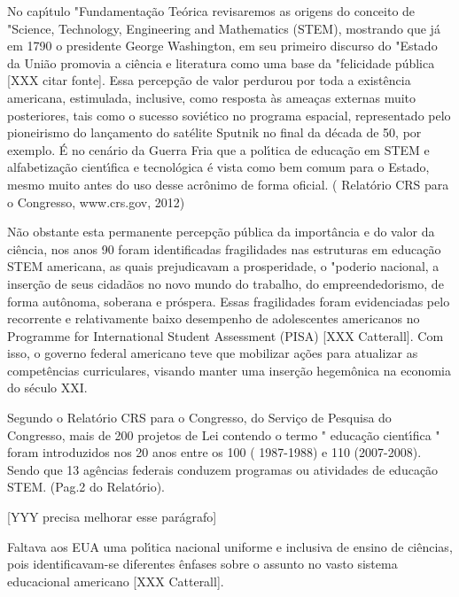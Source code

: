 \documentclass[
12pt,		%
openright,	%
twoside,  %
a4paper,			%
chapter=TITLE,		%
english,			%
french,				%
spanish,			%
brazil				%
]{USPSC-classe/USPSC}
\begin{document}
No cap\'{\i}tulo "Fundamenta\c{c}\~ao Te\'orica revisaremos as origens do conceito de "Science, Technology, Engineering and Mathematics (STEM), mostrando que j\'a em 1790 o  presidente George Washington, em seu primeiro discurso do "Estado da Uni\~ao promovia a ci\^encia e literatura como uma base da "felicidade p\'ublica [XXX citar fonte]. Essa percep\c{c}\~ao de valor perdurou por toda a exist\^encia americana, estimulada, inclusive, como resposta \`as amea\c{c}as externas muito posteriores, tais como o sucesso sovi\'etico no programa espacial, representado pelo pioneirismo do lan\c{c}amento do sat\'elite Sputnik no final da d\'ecada de 50, por exemplo. \'E no cen\'ario da Guerra Fria que a pol\'{\i}tica de educa\c{c}\~ao em STEM e alfabetiza\c{c}\~ao  cient\'{\i}fica e tecnol\'ogica  \'e vista como bem comum para o Estado, mesmo muito antes do uso desse acr\^onimo de forma oficial. ( Relat\'orio CRS para o Congresso, www.crs.gov, 2012) 




N\~ao obstante esta permanente percep\c{c}\~ao p\'ublica da import\^ancia e do valor da ci\^encia, nos anos 90 foram identificadas fragilidades nas estruturas em educa\c{c}\~ao STEM americana, as quais prejudicavam a prosperidade, o "poderio nacional, a inser\c{c}\~ao de seus cidad\~aos no novo mundo do trabalho, do empreendedorismo, de forma aut\^onoma, soberana  e pr\'ospera. Essas fragilidades foram evidenciadas pelo recorrente e relativamente baixo desempenho de adolescentes americanos no Programme for International Student Assessment (PISA) [XXX Catterall]. Com isso, o governo federal americano teve que mobilizar a\c{c}\~oes para atualizar as compet\^encias curriculares, visando manter uma inser\c{c}\~ao hegem\^onica na economia do s\'eculo XXI. 




Segundo o Relat\'orio CRS para o Congresso, do Servi\c{c}o de Pesquisa do Congresso, mais de 200 projetos de Lei contendo o termo " educa\c{c}\~ao cient\'{\i}fica " foram introduzidos nos 20 anos entre os 100 ( 1987-1988) e 110 (2007-2008). Sendo que 13 ag\^encias federais conduzem programas ou atividades de educa\c{c}\~ao STEM. (Pag.2 do Relat\'orio). 




[YYY precisa melhorar esse par\'agrafo]




Faltava aos EUA uma pol\'{\i}tica nacional uniforme e inclusiva de ensino de ci\^encias, pois identificavam-se diferentes \^enfases sobre o assunto no vasto sistema educacional americano [XXX Catterall]. 
\end{document}
